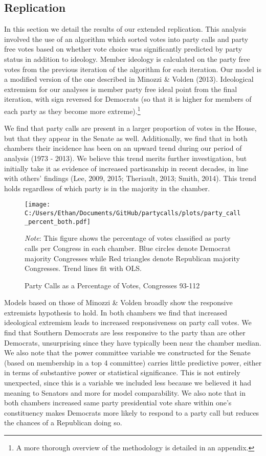 \documentclass[12pt]{article}
\newcommand\fnote[1]{\captionsetup{font=small}\caption*{#1}}
\begin{document}
\subsection{Replication}

In this section we detail the results of our extended replication. This analysis involved the use of an algorithm which sorted votes into party calls and party free votes based on whether vote choice was significantly predicted by party status in addition to ideology. Member ideology is calculated on the party free votes from the previous iteration of the algorithm for each iteration. Our model is a modified version of the one described in Minozzi \& Volden (2013). Ideological extremism for our analyses is member party free ideal point from the final iteration, with sign reversed for Democrats (so that it is higher for members of each party as they become more extreme).\footnote{A more thorough overview of the methodology is detailed in an appendix.}

We find that party calls are present in a larger proportion of votes in the House, but that they appear in the Senate as well. Additionally, we find that in both chambers their incidence has been on an upward trend during our period of analysis (1973 - 2013). We believe this trend merits further investigation, but initially take it as evidence of increased partisanship in recent decades, in line with others' findings (Lee, 2009, 2015; Theriault, 2013; Smith, 2014). This trend holds regardless of which party is in the majority in the chamber.


\begin{figure}[H]
	\centering
	\caption{Party Calls as a Percentage of Votes, Congresses 93-112}
	\texttt{[image: C:/Users/Ethan/Documents/GitHub/partycalls/plots/party\_call\_percent\_both.pdf]}
	\fnote{\textit{Note}: This figure shows the percentage of votes classified as party calls per Congress in each chamber. Blue circles denote Democrat majority Congresses while Red triangles denote Republican majority Congresses. Trend lines fit with OLS.}
\end{figure}

Models based on those of Minozzi \& Volden broadly show the responsive extremists hypothesis to hold. In both chambers we find that increased ideological extremism leads to increased responsiveness on party call votes. We find that Southern Democrats are less responsive to the party than are other Democrats, unsurprising since they have typically been near the chamber median. We also note that the power committee variable we constructed for the Senate (based on membership in a top 4 committee) carries little predictive power, either in terms of substantive power or statistical significance. This is not entirely unexpected, since this is a variable we included less because we believed it had meaning to Senators and more for model comparability. We also note that in both chambers increased same party presidential vote share within one's constituency makes Democrats more likely to respond to a party call but reduces the chances of a Republican doing so.
\end{document}
